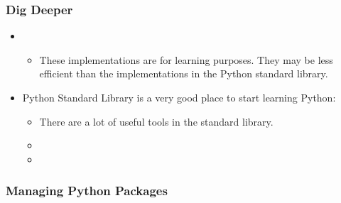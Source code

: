 \documentclass[letterpaper,10pt,english]{sphinxmanual}
\begin{document}
\subsubsection{Dig Deeper}
\label{\detokenize{resource/programing/python_basic:dig-deeper}}\begin{itemize}
\item {} 
\begin{itemize}
\item {} 
These implementations are for learning purposes. They may be less
efficient than the implementations in the Python standard library.

\end{itemize}

\item {} 
Python Standard Library is a very good place to start learning
Python:
\begin{itemize}
\item {} 
There are a lot of useful tools in the standard library.

\item {} 

\item {} 

\end{itemize}

\end{itemize}


\subsubsection{Managing Python Packages}
\label{\detokenize{resource/programing/python_basic:managing-python-packages}}
\end{document}
